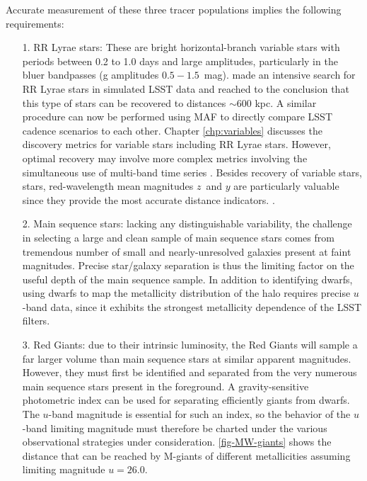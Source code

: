 Accurate measurement of these three tracer populations implies the following requirements:


\begin{itemize}

\item[1.] RR Lyrae stars: These are bright horizontal-branch variable
  stars with periods between 0.2 to 1.0 days and large amplitudes,
  particularly in the bluer bandpasses (g amplitudes $0.5 -
  1.5$~mag). \citet{2012AJ....144....9O} made an intensive search for
  RR Lyrae stars in simulated LSST data and reached to the conclusion
  that this type of stars can be recovered to distances $\sim 600$
  kpc. A similar procedure can now be performed using MAF to directly
  compare LSST cadence scenarios to each other.
  Chapter \ref{chp:variables} discusses the
  discovery metrics for variable stars including RR Lyrae
  stars. However, optimal recovery may involve more complex metrics
  involving the simultaneous use of multi-band time series
  \citep{vanderplas15,vivas16}. Besides recovery of variable stars,
  stars, red-wavelength mean magnitudes $z$~and $y$ are particularly
  valuable since they provide the most accurate distance indicators.
\citep{caceres08}.

\item[2.] Main sequence stars: lacking any distinguishable variability, the
challenge in selecting a large and clean sample of main sequence stars comes
from tremendous number of small and nearly-unresolved galaxies present at
faint magnitudes. Precise star/galaxy separation is thus the limiting factor
on the useful depth of the main sequence sample. In addition to identifying
dwarfs, using dwarfs to map the metallicity distribution of the halo requires
precise $u$-band data, since it exhibits the strongest metallicity dependence of
the LSST filters.

\item[3.] Red Giants: due to their intrinsic luminosity, the Red Giants will sample
a far larger volume than main sequence stars at similar apparent magnitudes. However, they must first be identified and separated from the very numerous main
sequence stars present in the foreground. A gravity-sensitive photometric index can
be used for separating efficiently giants from dwarfs. The $u$-band magnitude is essential for such an index, so
the behavior of the $u$-band limiting magnitude must therefore be charted under the various observational strategies under consideration.
\autoref{fig-MW-giants} shows the distance that can be reached
by M-giants of different metallicities assuming limiting magnitude $u = 26.0$.

\end{itemize}

